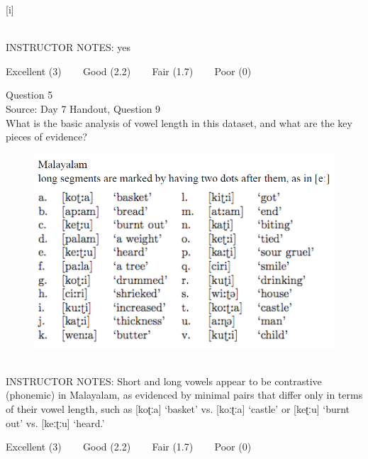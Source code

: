 \documentclass[12pt]{article}
\begin{document}
{[i]}


~\\
INSTRUCTOR NOTES: yes


\vfill
Excellent (3) ~~~ Good (2.2) ~~~ Fair (1.7) ~~~ Poor (0)
\newpage

{\large Question 5}\\

Source: Day 7 Handout, Question 9\\

What is the basic analysis of vowel length in this dataset, and what are the key pieces of evidence?\\

\begin{figure}[H]
\includegraphics{../images/malayalam.png}
\end{figure}

~\\
INSTRUCTOR NOTES: Short and long vowels appear to be contrastive (phonemic) in Malayalam, as evidenced by minimal pairs that differ only in terms of their vowel length, such as [koʈːa] ‘basket’ vs. [koːʈːa] ‘castle’ or [keʈːu] ‘burnt out’ vs. [keːʈːu] ‘heard.’


\vfill
Excellent (3) ~~~ Good (2.2) ~~~ Fair (1.7) ~~~ Poor (0)
\newpage

\begin{center}
\textbf{{\color{red}{\HUGE END OF EXAM}}}\\

\end{center}
\newpage

\begin{center}
\textbf{{\color{blue}{\HUGE START OF EXAM\\}}}

\textbf{{\color{blue}{\HUGE Student ID: 1794\\}}}

\textbf{{\color{blue}{\HUGE 12:15 PM - 12:30 PM\\}}}

\end{center}
\newpage
\end{document}
